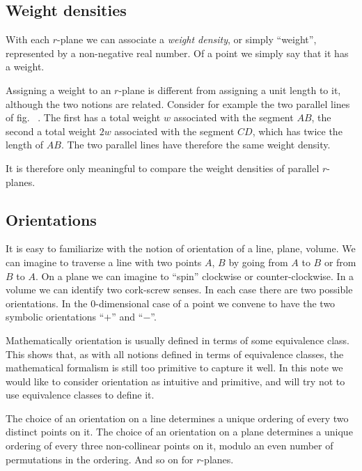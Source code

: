 \documentclass[\ifafour a4paper,12pt,\else a5paper,10pt,\fi%
onecolumn,oneside,article,%
british%
]{memoir}
\theoremstyle{remark}
\theoremstyle{innote}
\renewcommand*{\|}{\nonscript\,\vert\nonscript\;\mathopen{}}
\newcommand*{\fig}{fig.}%
\newcommand*{\puzzle}{{\fontencoding{U}\fontfamily{fontawesometwo}\selectfont\symbol{225}}}
\newcommand{\mynote}[1]{ {\color{notecolour}\puzzle\ #1}}
\newcommand*{\+}{\boxplus}
\newcommand*{\yr}{r}
\newcommand*{\yw}{w}
\begin{document}


\subsection{Weight densities}
\label{sec:weight_densities}

With each $\yr$-plane we can associate a \emph{weight density}, or simply
\enquote{weight}, represented by a non-negative real number. Of a point we
simply say that it has a weight.

Assigning a weight to an $\yr$-plane is different from assigning a unit
length to it, although the two notions are related. Consider for example
the two parallel lines of \fig\mynote{}. The first has a total weight $\yw$
associated with the segment $AB$, the second a total weight $2\yw$
associated with the segment $CD$, which has twice the length of $AB$. The two
parallel lines have therefore the same weight density.

It is therefore only meaningful to compare the weight densities of parallel
$\yr$-planes.


\subsection{Orientations}
\label{sec:orientations2}

It is easy to familiarize with the notion of orientation of a line, plane,
volume. We can imagine to traverse a line with two points $A$, $B$ by going
from $A$ to $B$ or from $B$ to $A$. On a plane we can imagine to
\enquote{spin} clockwise or counter-clockwise. In a volume we can identify
two cork-screw senses. In each case there are two possible orientations. In
the $0$-dimensional case of a point we convene to have the two symbolic
orientations \enquote{$+$} and \enquote{$-$}. 

Mathematically orientation is usually defined in terms of some equivalence
class. This shows that, as with all notions defined in terms of equivalence
classes, the mathematical formalism is still too primitive to capture it
well. In this note we would like to consider orientation as intuitive and
primitive, and will try not to use equivalence classes to define it.

The choice of an orientation on a line determines a unique ordering of
every two distinct points on it. The choice of an orientation on a plane
determines a unique ordering of every three non-collinear points on it,
modulo an even number of permutations in the ordering. And so on for
$\yr$-planes.
\end{document}
